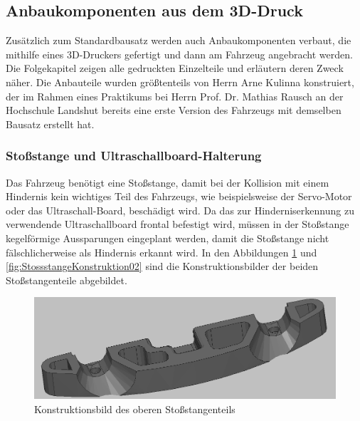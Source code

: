 \newpage

\subsection{Anbaukomponenten aus dem 3D-Druck}\label{Sec2Sub2}

Zusätzlich zum Standardbausatz werden auch Anbaukomponenten verbaut, die mithilfe eines 3D-Druckers gefertigt und dann am Fahrzeug angebracht werden. Die Folgekapitel zeigen alle gedruckten Einzelteile und erläutern deren Zweck näher. Die Anbauteile wurden größtenteils von Herrn Arne Kulinna konstruiert, der im Rahmen eines Praktikums bei Herrn Prof. Dr. Mathias Rausch an der Hochschule Landshut bereits eine erste Version des Fahrzeugs mit demselben Bausatz erstellt hat.

\subsubsection{Stoßstange und Ultraschallboard-Halterung}\label{Sec2Sub2SubSub1}

Das Fahrzeug benötigt eine Stoßstange, damit bei der Kollision mit einem Hindernis kein wichtiges Teil des Fahrzeugs, wie beispielsweise der Servo-Motor oder das Ultraschall-Board, beschädigt wird. Da das zur Hinderniserkennung zu verwendende Ultraschallboard frontal befestigt wird, müssen in der Stoßstange kegelförmige Aussparungen eingeplant werden, damit die Stoßstange nicht fälschlicherweise als Hindernis erkannt wird. In den Abbildungen \ref{fig:StossstangeKonstruktion01} und \ref{fig:StossstangeKonstruktion02} sind die Konstruktionsbilder der beiden Stoßstangenteile abgebildet.

\begin{figure}[H] %
\includegraphics[width=.8\textwidth]{sec2/images/3DAnbaukomponenten/Konstruktionsbilder/StossstangeKonstruktion01} 
\centering
\captionsetup{width=.95\textwidth}
\caption[Konstruktionsbild des oberen Stoßstangenteils]{Konstruktionsbild des oberen Stoßstangenteils}\centering
\label{fig:StossstangeKonstruktion01}
\end{figure}

